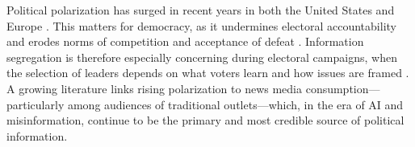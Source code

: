 \documentclass[12pt]{article}
\begin{document}



Political polarization has surged in recent years in both the United States and Europe \citep{Boxell2020CrossCountryTI,Reiljan2019FearAL}. This matters for democracy, as it undermines electoral accountability and erodes norms of competition and acceptance of defeat \citep{Graham2019DemocracyIA}. Information segregation is therefore especially concerning during electoral campaigns, when the selection of leaders depends on what voters learn and how issues are framed \citep{Besley2005}. A growing literature links rising polarization to news media consumption—particularly among audiences of traditional outlets—which, in the era of AI and misinformation, continue to be the primary and most credible source of political information. 



\end{document}
